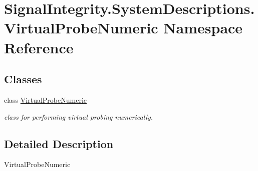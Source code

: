 \hypertarget{namespaceSignalIntegrity_1_1SystemDescriptions_1_1VirtualProbeNumeric}{}\section{Signal\+Integrity.\+System\+Descriptions.\+Virtual\+Probe\+Numeric Namespace Reference}
\label{namespaceSignalIntegrity_1_1SystemDescriptions_1_1VirtualProbeNumeric}
\subsection*{Classes}
\begin{DoxyCompactItemize}
\item 
class \hyperlink{classSignalIntegrity_1_1SystemDescriptions_1_1VirtualProbeNumeric_1_1VirtualProbeNumeric}{Virtual\+Probe\+Numeric}
\begin{DoxyCompactList}\small\item\em class for performing virtual probing numerically. \end{DoxyCompactList}\end{DoxyCompactItemize}


\subsection{Detailed Description}
\begin{DoxyVerb}VirtualProbeNumeric\end{DoxyVerb}
 
